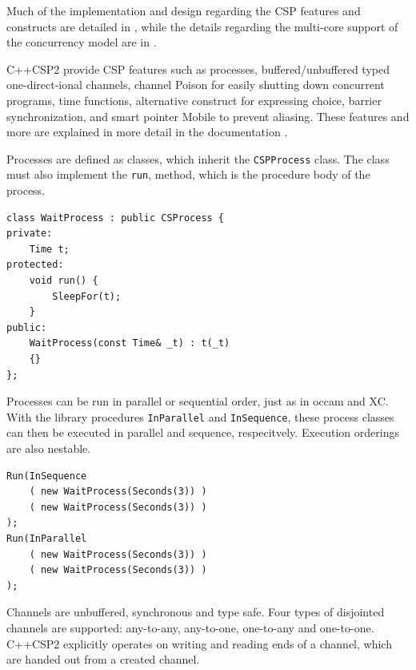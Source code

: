Much of the implementation and design regarding the CSP features and constructs are detailed in \citet{c++csp}, while the details regarding the multi-core support of the concurrency model are in \citet{c++csp2}.

C++CSP2 provide CSP features such as processes, buffered/unbuffered typed one-direct\hyp{}ional channels, channel Poison for easily shutting down concurrent programs, time functions, alternative construct for expressing choice, barrier synchronization, and smart pointer Mobile to prevent aliasing. These features and more are explained in more detail in the documentation \citep{c++csp2doc}.

Processes are defined as classes, which inherit the \texttt{CSPProcess} class. The class must also implement the \texttt{run}, method, which is the procedure body of the process. 

\noindent\begin{minipage}{\textwidth}
\begin{lstlisting}[style={CustomC++},frame={},numbers={none},xleftmargin={4em}]
class WaitProcess : public CSProcess {
private:
    Time t;
protected:
    void run() {
        SleepFor(t);
    }
public:
    WaitProcess(const Time& _t) : t(_t)
    {}
};
\end{lstlisting}
\end{minipage}

Processes can be run in parallel or sequential order, just as in occam and XC. With the library procedures \texttt{InParallel} and \texttt{InSequence}, these process classes can then be executed in parallel and sequence, respecitvely. Execution orderings are also nestable.

\noindent\begin{minipage}{\textwidth}
\begin{lstlisting}[style={CustomC++},frame={},numbers={none},xleftmargin={4em}]
Run(InSequence
    ( new WaitProcess(Seconds(3)) )
    ( new WaitProcess(Seconds(3)) )
);
Run(InParallel
    ( new WaitProcess(Seconds(3)) )
    ( new WaitProcess(Seconds(3)) )
);
\end{lstlisting}
\end{minipage}

Channels are unbuffered, synchronous and type safe. Four types of disjointed channels are supported: any\hyp{}to\hyp{}any, any\hyp{}to\hyp{}one, one\hyp{}to\hyp{}any and one\hyp{}to\hyp{}one. C++CSP2 explicitly operates on writing and reading ends of a channel, which are handed out from a created channel. 

